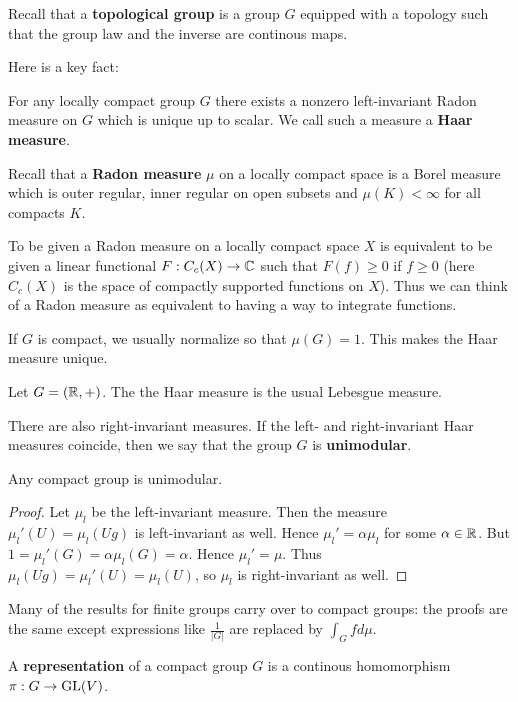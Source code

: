 \documentclass[11pt, english]{article}
\begin{document}
Recall that a \textbf{topological group} is a group $G$ equipped with a topology such that the group law and the inverse are continous maps. 

Here is a key fact:
\begin{prop}
For any locally compact group $G$ there exists a nonzero left-invariant Radon measure on $G$ which is unique up to scalar. We call such a measure a \textbf{Haar measure}.  
\end{prop}

Recall that a \textbf{Radon measure} $\mu$ on a locally compact space is a Borel measure which is outer regular, inner regular on open subsets and $\mu(K) < \infty$ for all compacts $K$.

To be given a Radon measure on a locally compact space $X$ is equivalent to be given a linear functional $F:C_c(X) \to \mathbb{C}$ such that $F(f) \geq 0$ if $f \geq 0$ (here $C_c(X)$ is the space of compactly supported functions on $X$). Thus we can think of a Radon measure as equivalent to having a way to integrate functions.

If $G$ is compact, we usually normalize so that $\mu(G)=1$. This makes the Haar measure unique.

\begin{example}
  Let $G=(\mathbb{R},+)$. The the Haar measure is the usual Lebesgue measure.
\end{example}

There are also right-invariant measures. If the left- and right-invariant Haar measures coincide, then we say that the group $G$ is \textbf{unimodular}.

\begin{lemma}
Any compact group is unimodular.  
\end{lemma}
\begin{proof}
 Let $\mu_l$ be the left-invariant measure. Then the measure $\mu_l'(U)= \mu_l(Ug)$ is left-invariant as well. Hence $\mu_l' = \alpha \mu_l$ for some $\alpha \in \mathbb{R}$. But $1=\mu_l'(G) = \alpha \mu_l(G) = \alpha$. Hence $\mu_l'=\mu$.
Thus $\mu_l(Ug)=\mu_l'(U)=\mu_l(U)$, so $\mu_l$ is right-invariant as well.
\end{proof}

Many of the results for finite groups carry over to compact groups: the proofs are the same except expressions like $\frac{1}{\lvert G \rvert}$ are replaced by $\int_G f d \mu$.

A \textbf{representation} of a compact group $G$ is a continous homomorphism $\pi:G \to \operatorname{GL}(V)$.
\end{document}
